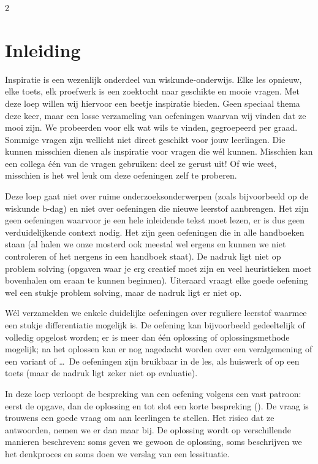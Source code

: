\begin{multicols}{2}                      
\inhoudstafelLoep		                  %
\section{Inleiding}

Inspiratie is een wezenlijk onderdeel van wiskunde-onderwijs. Elke les opnieuw, elke toets, elk proefwerk is een zoektocht naar geschikte en mooie vragen. Met deze loep willen wij hiervoor een beetje inspiratie bieden. Geen speciaal thema deze keer, maar een losse verzameling van oefeningen waarvan wij vinden dat ze mooi zijn. We probeerden voor elk wat wils te vinden, gegroepeerd per graad. Sommige vragen zijn wellicht niet direct geschikt voor jouw leerlingen. Die kunnen misschien dienen als inspiratie voor vragen die wél kunnen. Misschien kan een collega één van de vragen gebruiken: deel ze gerust uit! Of wie weet, misschien is het wel leuk om deze oefeningen zelf te proberen. 

Deze loep gaat niet over ruime onderzoeksonderwerpen (zoals bijvoorbeeld op de wiskunde b-dag) en
niet over oefeningen die nieuwe leerstof aanbrengen. Het zijn geen oefeningen waarvoor je een hele inleidende tekst moet lezen, er is dus geen verduidelijkende context nodig. Het zijn geen oefeningen die in alle handboeken staan (al halen we onze mosterd ook meestal wel ergens en kunnen we niet controleren of het nergens in een handboek staat). De nadruk ligt niet op problem solving (opgaven waar je erg creatief moet zijn en veel heuristieken moet bovenhalen om eraan te kunnen beginnen). Uiteraard vraagt elke goede oefening wel een stukje problem solving, maar de nadruk ligt er niet op.

Wél verzamelden we enkele duidelijke oefeningen over reguliere leerstof  waarmee een stukje differentiatie mogelijk is. De oefening kan bijvoorbeeld gedeeltelijk of volledig opgelost worden; er is meer dan één oplossing of oplossingsmethode mogelijk; na het oplossen kan er nog nagedacht worden over een veralgemening of een variant of \ldots \ De oefeningen zijn bruikbaar in de les, als huiswerk of op een toets (maar de nadruk ligt zeker niet op evaluatie).

In deze loep verloopt de bespreking van een oefening volgens een vast patroon: eerst de opgave, dan de oplossing en tot slot een korte bespreking (). De vraag  is trouwens een goede vraag om aan leerlingen te stellen. Het risico dat ze  antwoorden, nemen we er dan maar bij.  De oplossing wordt op verschillende manieren beschreven: soms geven we gewoon de oplossing, soms beschrijven we het denkproces en soms doen we verslag van een lessituatie.


\end{multicols}
